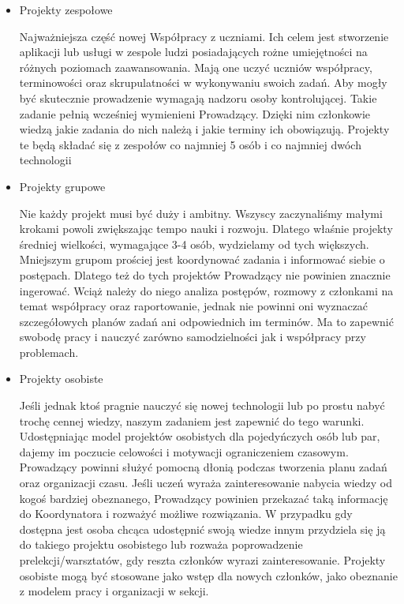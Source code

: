 \documentclass[9pt,a4paper]{report}
\begin{document}
\begin{itemize} 

\item Projekty zespołowe 

 

Najważniejsza część nowej Współpracy z uczniami. Ich celem jest stworzenie aplikacji lub usługi w zespole ludzi posiadających rożne umiejętności na różnych poziomach zaawansowania. Mają one uczyć uczniów współpracy, terminowości oraz skrupulatności w wykonywaniu swoich zadań. Aby mogły być skutecznie prowadzenie wymagają nadzoru osoby kontrolującej. Takie zadanie pełnią wcześniej wymienieni Prowadzący. Dzięki nim członkowie wiedzą jakie zadania do nich należą i jakie terminy ich obowiązują. Projekty te będą składać się z zespołów co najmniej 5 osób i co najmniej dwóch technologii\\ 

\item Projekty grupowe 

 

Nie każdy projekt musi być duży i ambitny. Wszyscy zaczynaliśmy małymi krokami powoli zwiększając tempo nauki i rozwoju. Dlatego właśnie projekty średniej wielkości, wymagające 3-4 osób, wydzielamy od tych większych. Mniejszym grupom prościej jest koordynować zadania i informować siebie o postępach. Dlatego też do tych projektów Prowadzący nie powinien znacznie ingerować. Wciąż należy do niego analiza postępów, rozmowy z członkami na temat współpracy oraz raportowanie, jednak nie powinni oni wyznaczać szczegółowych planów zadań ani odpowiednich im terminów. Ma to zapewnić swobodę pracy i nauczyć zarówno samodzielności jak i współpracy przy problemach. 

\item Projekty osobiste 

 

Jeśli jednak ktoś pragnie nauczyć się nowej technologii lub po prostu nabyć trochę cennej wiedzy, naszym zadaniem jest zapewnić do tego warunki. Udostępniając model projektów osobistych dla pojedyńczych osób lub par, dajemy im poczucie celowości i motywacji ograniczeniem czasowym. Prowadzący powinni służyć pomocną dłonią podczas tworzenia planu zadań oraz organizacji czasu. Jeśli uczeń wyraża zainteresowanie nabycia wiedzy od kogoś bardziej obeznanego, Prowadzący powinien przekazać taką informację do Koordynatora i rozważyć możliwe rozwiązania. W przypadku gdy dostępna jest osoba chcąca udostępnić swoją wiedze innym przydziela się ją do takiego projektu osobistego lub rozważa poprowadzenie prelekcji/warsztatów, gdy reszta członków wyrazi zainteresowanie. Projekty osobiste mogą być stosowane jako wstęp dla nowych członków, jako obeznanie z modelem pracy i organizacji w sekcji. 

\end{itemize} 
\end{document}
